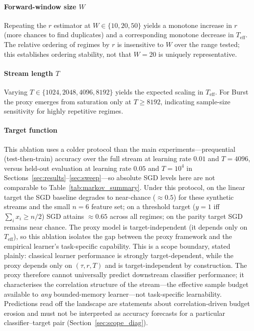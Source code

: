 \documentclass[sensors,article,submit,pdftex,moreauthors]{Definitions/mdpi}
\newcommand{\Teff}{T_{\mathrm{eff}}}
\providecommand{\DIFadd}[1]{{\protect\color{blue}#1}} %
\providecommand{\DIFdel}[1]{} %
\providecommand{\DIFaddbegin}{} %
\providecommand{\DIFaddend}{} %
\providecommand{\DIFdelbegin}{} %
\providecommand{\DIFdelend}{} %
\begin{document}
\paragraph{Forward-window size $W$} Repeating the $r$ estimator at $W \in \{10, 20, 50\}$ yields a monotone increase in $r$ (more chances to find duplicates) and a corresponding monotone decrease in $\Teff$. The relative ordering of regimes by $r$ is \DIFdelbegin \DIFdel{preserved across }\DIFdelend \DIFaddbegin \DIFadd{insensitive to }\DIFaddend $W$ \DIFdelbegin \DIFdel{values, confirming }\DIFdelend \DIFaddbegin \DIFadd{over the range tested; this establishes ordering stability, not }\DIFaddend that $W = 20$ is \DIFdelbegin \DIFdel{a representativechoice}\DIFdelend \DIFaddbegin \DIFadd{uniquely representative}\DIFaddend .

\paragraph{Stream length $T$} Varying $T \in \{1024, 2048, 4096, 8192\}$ yields the expected scaling in $\Teff$. For Burst the proxy emerges from saturation only at $T \geq 8192$, indicating sample-size sensitivity for highly repetitive regimes.

\paragraph{Target function} \DIFdelbegin \DIFdel{On the }\DIFdelend \DIFaddbegin \DIFadd{This ablation uses a colder protocol than the main experiments---prequential (test-then-train) accuracy over the full stream at learning rate $0.01$ and $T = 4096$, versus held-out evaluation at learning rate $0.05$ and $T = 10^{4}$ in Sections~\ref{sec:results}--\ref{sec:sweep}---so absolute SGD levels here are not comparable to Table~\ref{tab:markov_summary}. Under this protocol, on the }\DIFaddend linear target the SGD baseline degrades to near-chance ($\approx 0.5$) for these synthetic streams and the small $n=6$ feature set; on a threshold target ($y = 1$ iff $\sum_i x_i \geq n/2$) SGD attains $\approx 0.65$ across all regimes; on the parity target SGD remains near chance. The proxy model is target-independent (it depends only on $\Teff$), so this ablation isolates the gap between the proxy framework and the empirical learner's task-specific capability. \DIFaddbegin \DIFadd{This is a scope boundary, stated plainly: classical learner performance is strongly target-dependent, while the proxy depends only on $(\tau, r, T)$ and is target-independent by construction. The proxy therefore cannot universally predict downstream classifier performance; it characterises the correlation structure of the stream---the effective sample budget available to }\emph{\DIFadd{any}} \DIFadd{bounded-memory learner---not task-specific learnability. Predictions read off the landscape are statements about correlation-driven budget erosion and must not be interpreted as accuracy forecasts for a particular classifier--target pair (Section~\ref{sec:scope_diag}).
}\DIFaddend 
\end{document}
